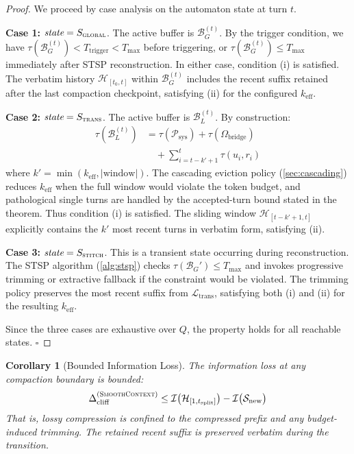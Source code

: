 \documentclass[10pt,twocolumn]{article}
\newtheorem{corollary}{Corollary}
\newcommand{\sys}{\textsc{SmoothContext}}
\newcommand{\bufG}{\mathcal{B}_G}
\newcommand{\bufL}{\mathcal{B}_L}
\newcommand{\psys}{\mathcal{P}_{\mathrm{sys}}}
\newcommand{\Dtok}{\tau}
\newcommand{\Tmax}{T_{\max}}
\newcommand{\Ttrig}{T_{\mathrm{trigger}}}
\begin{document}
\begin{proof}
  We proceed by case analysis on the automaton state at turn $t$.

  \textbf{Case 1:} $\textit{state} = S_{\textsc{global}}$. The active buffer is $\bufG^{(t)}$. By the trigger condition, we have $\Dtok(\bufG^{(t)}) < \Ttrig < \Tmax$ before triggering, or $\Dtok(\bufG^{(t)}) \leq \Tmax$ immediately after STSP reconstruction. In either case, condition (i) is satisfied. The verbatim history $\mathcal{H}_{[t_0, t]}$ within $\bufG^{(t)}$ includes the recent suffix retained after the last compaction checkpoint, satisfying (ii) for the configured $k_{\mathrm{eff}}$.

  \textbf{Case 2:} $\textit{state} = S_{\textsc{trans}}$. The active buffer is $\bufL^{(t)}$. By construction:
  \begin{align}
    \Dtok(\bufL^{(t)}) &= \Dtok(\psys) + \Dtok(\Omega_{\mathrm{bridge}}) \nonumber \\
    &\quad + \sum_{i=t-k'+1}^{t} \Dtok(u_i, r_i)
  \end{align}
  where $k' = \min(k_{\mathrm{eff}}, |\text{window}|)$. The cascading eviction policy (\cref{sec:cascading}) reduces $k_{\mathrm{eff}}$ when the full window would violate the token budget, and pathological single turns are handled by the accepted-turn bound stated in the theorem. Thus condition (i) is satisfied. The sliding window $\mathcal{H}_{[t-k'+1, t]}$ explicitly contains the $k'$ most recent turns in verbatim form, satisfying (ii).

  \textbf{Case 3:} $\textit{state} = S_{\textsc{stitch}}$. This is a transient state occurring during reconstruction. The STSP algorithm (\cref{alg:stsp}) checks $\Dtok(\bufG') \leq \Tmax$ and invokes progressive trimming or extractive fallback if the constraint would be violated. The trimming policy preserves the most recent suffix from $\mathcal{L}_{\mathrm{trans}}$, satisfying both (i) and (ii) for the resulting $k_{\mathrm{eff}}$.

  Since the three cases are exhaustive over $Q$, the property holds for all reachable states. $\square$
\end{proof}

\begin{corollary}[Bounded Information Loss]
  The information loss at any compaction boundary is bounded:
  \begin{equation}
    \Delta_{\mathrm{cliff}}^{(\sys{})} \leq \mathcal{I}\bigl(\mathcal{H}_{[1, t_{\mathrm{split}}]}\bigr) - \mathcal{I}\bigl(\mathcal{S}_{\mathrm{new}}\bigr)
  \end{equation}
  That is, lossy compression is confined to the compressed prefix and any budget-induced trimming. The retained recent suffix is preserved verbatim during the transition.
\end{corollary}
\end{document}
